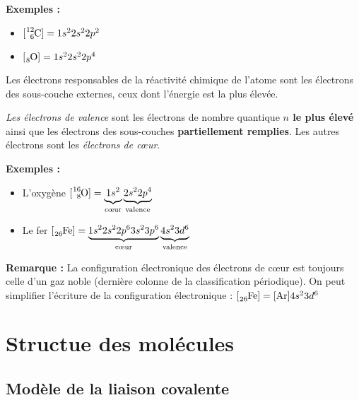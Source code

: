 \documentclass{cours}
\begin{document}
	      \textbf{Exemples :} \begin{itemize}
		      \item $\ce{[^12_6C]} = 1s^22s^22p^2$
		      \item $\ce{[_8O]} = 1s^22s^22p^4$
	      \end{itemize}

Les électrons responsables de la réactivité chimique de l'atome sont les
électrons des sous-couche externes, ceux dont l'énergie est la plus élevée.

\emph{Les électrons de valence} sont les électrons de nombre quantique
\textbf{$n$ le plus élevé} ainsi que les électrons des sous-couches
\textbf{partiellement remplies}. Les autres électrons sont les \emph{électrons
	de c\oe{}ur}.

\textbf{Exemples :}
\begin{itemize}
  \item L'oxygène $\ce{[^{16}_8O]} = \underbrace{1s^2\vphantom{p}}_\text{c\oe{}ur\vphantom{\text{l}}} \underbrace{2s^22p^4}_\text{valence}$

  \item Le fer $\ce{[_{26}Fe]} = \underbrace{1s^22s^22p^63s^23p^6}_\text{c\oe{}ur\vphantom{\text{l}}} \underbrace{4s^23d^6\vphantom{p}}_\text{valence}$
\end{itemize}

\textbf{Remarque : } La configuration électronique des électrons de c\oe{}ur est toujours celle d'un gaz noble (dernière colonne de la classification périodique). On peut simplifier l'écriture de la configuration électronique :
 $[\ce{_{26}Fe}] = [\ce{Ar}]4s^23d^6$
\section{Structue des molécules}%
\label{sec:structue_des_molecules}

\subsection{Modèle de la liaison covalente}%
\label{sub:modele_de_la_liaison_covalente}
\end{document}
